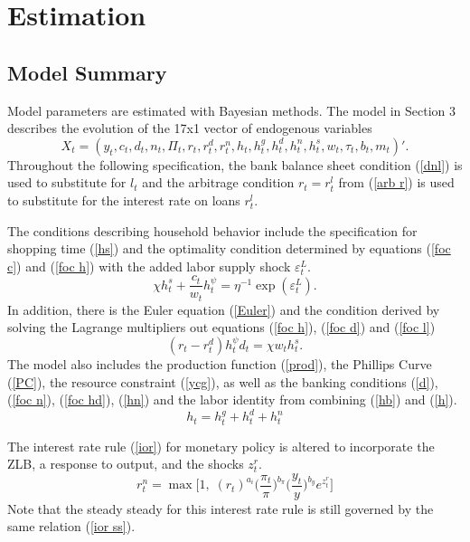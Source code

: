 \documentclass[]{article}
\begin{document}
\section{Estimation}

\subsection{Model Summary}

Model parameters are estimated with Bayesian methods. The model in Section 3 describes the evolution of the 17x1 vector of endogenous variables
\[X_{t}=(y_{t},c_{t},d_{t},n_{t},\Pi_{t},r_{t},r^{d}_{t},r^{n}_{t},h_{t},h^{g}_{t},h^{d}_{t},h^{n}_{t},h^{s}_{t},w_{t},\tau_{t},b_{t},m_{t})'. 
\]
Throughout the following specification, the bank balance sheet condition (\ref{dnl}) is used to substitute for $l_{t}$ and the arbitrage condition $r_{t}=r^{l}_{t}$ from (\ref{arb r}) is used to substitute for the interest rate on loans $r^{l}_{t}$.

The conditions describing household behavior include the specification for shopping time (\ref{hs}) and the optimality condition determined by equations (\ref{foc c}) and (\ref{foc h}) with the added labor supply shock $\varepsilon^L_t$.
\begin{equation}
    \chi h^{s}_{t}+\frac{c_{t}}{w_{t}}h_{t}^{\psi}=\eta^{-1}\exp(\varepsilon^L_t).
    \label{HH opt labor}
\end{equation}
In addition, there is the Euler equation (\ref{Euler}) and the condition derived by solving the Lagrange multipliers out equations (\ref{foc h}), (\ref{foc d}) and (\ref{foc l})
\begin{equation*}
    (r_{t}-r^{d}_{t})h_{t}^{\psi}d_{t}=  \chi w_{t}h^{s}_{t}.
\end{equation*}
The model also includes the production function (\ref{prod}), the Phillips Curve (\ref{PC}), the resource constraint (\ref{ycg}), as well as the banking conditions (\ref{d}), (\ref{foc n}), (\ref{foc hd}), (\ref{hn}) and the labor identity from combining (\ref{hb}) and (\ref{h}).
\begin{equation*}
    h_{t}=h^{g}_{t}+h^{d}_{t}+h^{n}_{t}
\end{equation*}

The interest rate rule (\ref{ior}) for monetary policy is altered to incorporate the ZLB, a response to output, and the shocks $z^r_t$.
\begin{equation}
  r^n_t = \max\!\Big[1,\; (r_t)^{a_i}\Big(\frac{\pi_t}{\pi}\Big)^{b_\pi}
\Big(\frac{y_t}{y}\Big)^{b_y} e^{z^r_t}\Big]  
\label{rn ZLB}
\end{equation}
Note that the steady steady for this interest rate rule is still governed by the same relation (\ref{ior ss}).
\end{document}
